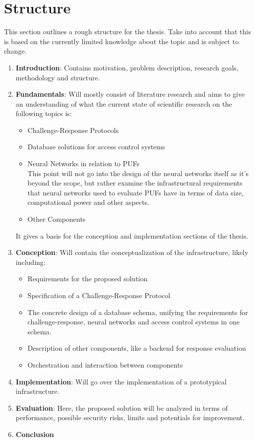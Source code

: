 \newpage
\section{Structure}

This section outlines a rough structure for the thesis.
Take into account that this is based on the currently limited knowledge about the topic
and is subject to change.

\begin{enumerate}
    \item \textbf{Introduction}: Contains motivation, problem description, research goals, methodology and structure.
    \item \textbf{Fundamentals}: Will mostly consist of literature research and aims to give an understanding
    of what the current state of scientific research on the following topics is:
    \begin{itemize}
        \item Challenge-Response Protocols
        \item Database solutions for access control systems
        \item Neural Networks in relation to \acp{PUF}\\
        This point will not go into the design of the neural networks itself as it's beyond the scope,
        but rather examine the infrastructural requirements that neural networks used to evaluate \acp{PUF}
        have in terms of data size, computational power and other aspects.
        \item Other Components
    \end{itemize}
    It gives a basis for the conception and implementation sections of the thesis.
    \item \textbf{Conception}: Will contain the conceptualization of the infrastructure, likely including:
    \begin{itemize}
        \item Requirements for the proposed solution
        \item Specification of a Challenge-Response Protocol
        \item The concrete design of a database schema, unifying the requirements
        for challenge-response, neural networks and access control systems in one schema.
        \item Description of other components, like a backend for response evaluation
        \item Orchestration and interaction between components
    \end{itemize}
    \item \textbf{Implementation}: Will go over the implementation of a prototypical infrastructure.
    \item \textbf{Evaluation}: Here, the proposed solution will be analyzed in terms of performance, possible security risks,
    limits and potentials for improvement.
    \item \textbf{Conclusion}
\end{enumerate}

